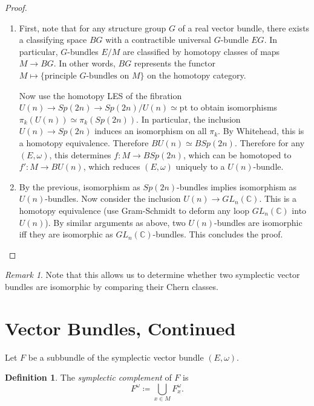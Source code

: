 \documentclass[leqno, openany]{memoir}
\theoremstyle{definition}
\newtheorem{defn}[thm]{Definition}
\theoremstyle{remark}
\newtheorem{rmk}[thm]{Remark}
\theoremstyle{plain}
\theoremstyle{definition}
\theoremstyle{remark}
\newcommand{\C}{\mathbb{C}}
\newcommand{\mr}[1]{\mathrm{#1}}
\begin{document}
\begin{proof} \begin{enumerate} \item First, note that for any structure group
    $G$ of a real vector bundle, there exists a classifying space $BG$ with a
    contractible universal $G$-bundle $EG$. In particular, $G$-bundles $E/M$
    are classified by homotopy classes of maps $M \to BG$. In other words, $BG$
    represents the functor $M \mapsto \{ \text{principle } G\text{-bundles on
    }M \}$ on the homotopy category.

            Now use the homotopy LES of the fibration $U(n) \to Sp(2n) \to
            Sp(2n)/U(n) \simeq \mr{pt}$ to obtain isomorphisms $\pi_k(U(n))
            \simeq \pi_k(Sp(2n))$. In particular, the inclusion $U(n) \to
            Sp(2n)$ induces an isomorphism on all $\pi_k$. By Whitehead, this
            is a homotopy equivalence. Therefore $BU(n) \simeq BSp(2n)$.
            Therefore for any $(E,\omega)$, this determines $f: M \to BSp(2n)$,
            which can be homotoped to $f': M \to BU(n)$, which reduces $(E,
            \omega)$ uniquely to a $U(n)$-bundle.  \item By the previous,
            isomorphism as $Sp(2n)$-bundles implies isomorphism as
            $U(n)$-bundles. Now consider the inclusion $U(n) \to GL_n(\C)$.
            This is a homotopy equivalence (use Gram-Schmidt to deform any loop
            $GL_n(\C)$ into $U(n)$). By similar arguments as above, two
            $U(n)$-bundles are isomorphic iff they are isomorphic as
            $GL_n(\C)$-bundles. This concludes the proof. \qedhere
            \end{enumerate} \end{proof}

\begin{rmk} Note that this allows us to determine whether two symplectic vector
bundles are isomorphic by comparing their Chern classes.  \end{rmk}

\section{Vector Bundles, Continued}%

Let $F$ be a subbundle of the symplectic vector bundle $(E, \omega)$.

\begin{defn} The \textit{symplectic complement} of $F$ is \[ F^{\omega}
\coloneqq \bigcup_{x \in M} F_x^{\omega}. \] \end{defn}
\end{document}
